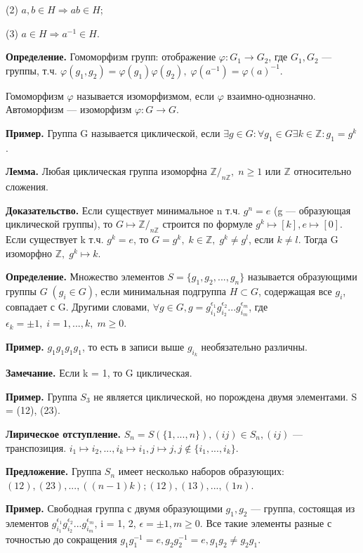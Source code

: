 \documentclass[12pt,a4paper]{article}
\begin{document}
(2) $a, b \in H \Rightarrow ab \in H$; 

(3) $a \in H \Rightarrow a^{-1} \in H$. 

\textbf{Определение.} Гомоморфизм групп: отображение $\varphi: G_{1} \to G_{2}$, где $G_{1}, G_{2}$ --- группы, т.ч. $\varphi(g_{1}, g_{2}) = \varphi(g_{1})\varphi(g_{2}), \; \varphi(a^{-1}) = \varphi(a)^{-1}.$

Гомоморфизм $\varphi$ называется изоморфизмом, если $\varphi$ взаимно-однозначно. Автоморфизм --- изоморфизм $\varphi: G \to G$. 

\textbf{Пример.} Группа G называется циклической, если $\exists g \in G: \forall g_{1} \in G \exists k \in \mathbb{Z}: g_{1} = g^{k}$. 

\textbf{Лемма.} Любая циклическая группа изоморфна $\mathbb{Z}/_{n\mathbb{Z}}, \; n \geq 1$ или $\mathbb{Z}$ относительно сложения. 

\textbf{Доказательство.} Если существует минимальное n т.ч. $g^{n} = e$ (g --- образующая циклической группы), то $G \mapsto \mathbb{Z}/_{n\mathbb{Z}}$ строится по формуле $g^{k} \mapsto [k], e \mapsto [0]$. Если существует k т.ч. $g^{k} = e$, то $G = {g^{k}, \; k \in \mathbb{Z}}, \; g^{k} \neq g^{l}$, если $k \neq l$. Тогда G изоморфно $\mathbb{Z}, \; g^{k} \mapsto k$.

\textbf{Определение.} Множество элементов $S = \{g_{1}, g_{2}, ..., g_{n}\}$ называется образующими группы $G \; (g_{i} \in G)$, если минимальная подгруппа $H \subset G$, содержащая все $g_i$, совпадает с G. Другими словами, $\forall g \in G, g = g_{i_1}^{\epsilon_{1}} g_{i_2}^{\epsilon_{2}}...g_{i_m}^{\epsilon_m}$, где $\epsilon_k = \pm 1, \; i = 1, ..., k, \; m \geq 0$. 

\textbf{Пример.} $g_{1}g_{1}g_{1}g_{1}$, то есть в записи выше $g_{i_k}$ необязательно различны. 

\textbf{Замечание.} Если k = 1, то G циклическая. 

\textbf{Пример.} Группа $S_3$ не является циклической, но порождена двумя элементами. S = {(12), (23)}. 

\textbf{Лирическое отступление.} $S_{n} = S(\{1, ..., n\}), (ij) \in S_{n}, (ij)$ --- транспозиция. $i_1 \mapsto i_2, ..., i_k \mapsto i_1, j \mapsto j, j \notin \{i_1, ..., i_k\}$. 

\textbf{Предложение.} Группа $S_n$ имеет несколько наборов образующих: $(1 2), (2 3), ..., ((n - 1) k); (1 2), (1 3), ..., (1 n)$. 

\textbf{Пример.} Свободная группа с двумя образующими $g_1, g_2$ --- группа, состоящая из элементов $g_{i_1}^{\epsilon_{1}} g_{i_2}^{\epsilon_{2}}...g_{i_m}^{\epsilon_m}$, i = 1, 2, $\epsilon = \pm 1, m \geq 0.$ Все такие элементы разные с точностью до сокращения $g_{1}g_{1}^{-1} = e, g_{2}g_{2}^{-1} = e, g_{1}g_{2} \neq g_{2}g_{1}$. 
\end{document}
